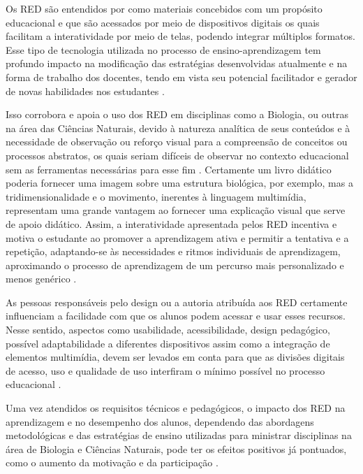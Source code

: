 \documentclass[portuguese]{textolivre}
\begin{document}
Os RED são entendidos por \textcite{area-moreira__2017} como materiais concebidos com um propósito educacional e que são acessados por meio de dispositivos digitais os quais facilitam a interatividade por meio de telas, podendo integrar múltiplos formatos. Esse tipo de tecnologia utilizada no processo de ensino-aprendizagem tem profundo impacto na modificação das estratégias desenvolvidas atualmente e na forma de trabalho dos docentes, tendo em vista seu potencial facilitador e gerador de novas habilidades nos estudantes \cite{vicente_alvarez_alisis_2018,silva_um_2017}.

Isso corrobora e apoia o uso dos RED em disciplinas como a Biologia, ou outras na área das Ciências Naturais, devido à natureza analítica de seus conteúdos e à necessidade de observação ou reforço visual para a compreensão de conceitos ou processos abstratos, os quais seriam difíceis de observar no contexto educacional sem as ferramentas necessárias para esse fim \cite{waghid_democratisation_2015}. Certamente um livro didático poderia fornecer uma imagem sobre uma estrutura biológica, por exemplo, mas a tridimensionalidade e o movimento, inerentes à linguagem multimídia, representam uma grande vantagem ao fornecer uma explicação visual que serve de apoio didático. Assim, a interatividade apresentada pelos RED incentiva e motiva o estudante ao promover a aprendizagem ativa e permitir a tentativa e a repetição, adaptando-se às necessidades e ritmos individuais de aprendizagem, aproximando o processo de aprendizagem de um percurso mais personalizado e menos genérico \cite{jones_kahoot!_2019}.

As pessoas responsáveis pelo design ou a autoria atribuída aos RED certamente influenciam a facilidade com que os alunos podem acessar e usar esses recursos. Nesse sentido, aspectos como usabilidade, acessibilidade, design pedagógico, possível adaptabilidade a diferentes dispositivos assim como a integração de elementos multimídia, devem ser levados em conta para que as divisões digitais de acesso, uso e qualidade de uso interfiram o mínimo possível no processo educacional \cite{cepeda-romero_evaluacion_2017,torres-diaz_desigualdad_2011}.

Uma vez atendidos os requisitos técnicos e pedagógicos, o impacto dos RED na aprendizagem e no desempenho dos alunos, dependendo das abordagens metodológicas e das estratégias de ensino utilizadas para ministrar disciplinas na área de Biologia e Ciências Naturais, pode ter os efeitos positivos já pontuados, como o aumento da motivação \cite{herrero_vazquez_revision_2020} e da participação \cite{rodriguez-altamirano_estudio_2010}.
\end{document}
